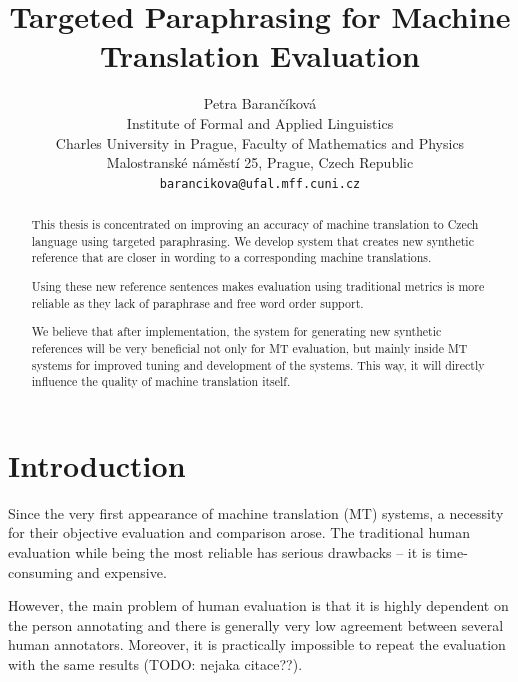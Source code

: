 \documentclass[11pt]{article}
\title{Targeted Paraphrasing for Machine Translation Evaluation}
\author{Petra Barančíková \\
  Institute of Formal and Applied Linguistics \\
  Charles University in Prague, Faculty of Mathematics and Physics\\
  Malostranské náměstí 25, Prague, Czech Republic \\
  {\tt barancikova@ufal.mff.cuni.cz} \\}
\date{}
\begin{document}
\maketitle
\begin{abstract}
This thesis is concentrated on improving an accuracy of machine translation to 
Czech language using targeted paraphrasing. We develop system that creates new
synthetic reference that are closer in wording to a corresponding machine 
translations. 

Using these new reference sentences makes evaluation using traditional metrics 
is more reliable as they lack of paraphrase and free word order support.

We believe that after implementation, the system for generating new synthetic
references will be very beneficial not only for MT evaluation, but mainly
inside MT systems for improved tuning and development of the systems. This way,
it will directly influence the quality of machine translation itself.

\end{abstract}

\section{Introduction}
Since the very first appearance of machine translation (MT) systems, a 
necessity for their objective evaluation and comparison arose. The traditional
human evaluation while being the most reliable has serious drawbacks -- it is 
time-consuming and expensive.

However, the main problem of human evaluation is that it is highly dependent on 
the person annotating and there is generally very low agreement between several 
human annotators. %
Moreover, it is practically impossible to repeat the evaluation with the same
results (TODO: nejaka citace??).
\end{document}
